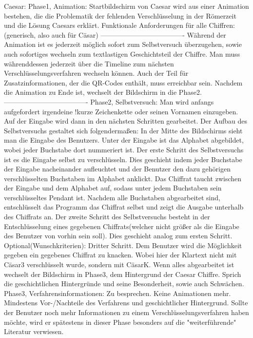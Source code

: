 \documentclass{article}
\begin{document}
Caesar:
Phase1, Animation:
Startbildschirm von Caesar wird aus einer Animation bestehen, die die Problematik der fehlenden Verschlüsselung in der Römerzeit und die Lösung Caesars erklärt.
Funktionale Anforderungen für alle Chiffren:(generisch, also auch für Cäsar)
-------------------------------------
Während der Animation ist es jederzeit möglich sofort zum Selbstversuch überzugehen, sowie auch sofortiges wechseln zum textlastigen Geschichtsteil der Chiffre.
Man muss währenddessen jederzeit über die Timeline zum nächsten Verschlüsselungsverfahren wechseln können.
Auch der Teil für Zusatzinformationen, der die QR-Codes enthält, muss erreichbar sein.
Nachdem die Animation zu Ende ist, wechselt der Bildschirm in die Phase2.
-------------------------------------
Phase2, Selbstversuch:
Man wird anfangs aufgefordert irgendeine !kurze Zeichenkette oder seinen Vornamen einzugeben. Auf der Eingabe wird dann in den nächsten Schritten gearbeitet.
             Der Aufbau des Selbstversuchs gestaltet sich folgendermaßen:
                    In der Mitte des Bildschirms sieht man die Eingabe des Benutzers. Unter der Eingabe ist das Alphabet abgebildet, wobei jeder Buchstabe dort nummeriert ist. Der erste Schritt des Selbstversuchs ist es die Eingabe selbst zu verschlüsseln. Dies geschieht indem jeder Buchstabe der Eingabe nacheinander aufleuchtet und der Benutzer den dazu gehörigen verschlüsselten Buchstaben im Alphabet anklickt. Das Chiffrat taucht zwischen der Eingabe und dem Alphabet auf, sodass unter jedem Buchstaben sein verschlüsseltes Pendant ist. Nachdem alle Buchstaben abgearbeitet sind, entschlüsselt das Programm das Chiffrat selbst und zeigt die Ausgabe unterhalb des Chiffrats an.
                     Der zweite Schritt des Selbstversuchs besteht in der Entschlüsselung eines gegebenen Chiffrats(welcher nicht größer als die Eingabe des Benutzer von vorhin sein soll). Dies geschieht analog zum ersten Schritt.
Optional(Wunschkriterien):
                    Dritter Schritt. Dem Benutzer wird die Möglichkeit gegeben ein gegebenes Chiffrat zu knacken. Wobei hier der Klartext nicht mit Cäsar3 verschlüsselt wurde, sondern mit CäsarK.
 Wenn alles abgearbeitet ist wechselt der Bildschirm in Phase3, dem Hintergrund der Caesar Chiffre. Sprich die geschichtlichen Hintergründe und seine Besonderheit, sowie auch Schwächen.
Phase3, Verfahrensinformationen:
Zu besprechen. Keine Animationen mehr. Mindestens Vor-/Nachteile des Verfahrens und geschichtlicher Hintergrund.
Sollte der Benutzer noch mehr Informationen zu einem Verschlüsselungsverfahren haben möchte, wird er spätestens in dieser Phase besonders auf die "weiterführende" Literatur verwiesen.
\end{document}
